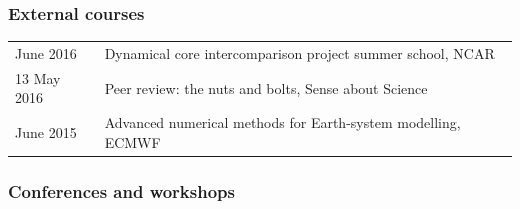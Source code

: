 \documentclass[a4paper,11pt]{article}
\begin{document}
\subsubsection*{External courses}
\begin{tabular}{l l}
June 2016 & Dynamical core intercomparison project summer school, NCAR \\
13 May 2016 & Peer review: the nuts and bolts, Sense about Science \\
June 2015 & Advanced numerical methods for Earth-system modelling, ECMWF \\
\end{tabular}

\subsubsection*{Conferences and workshops}
\end{document}
